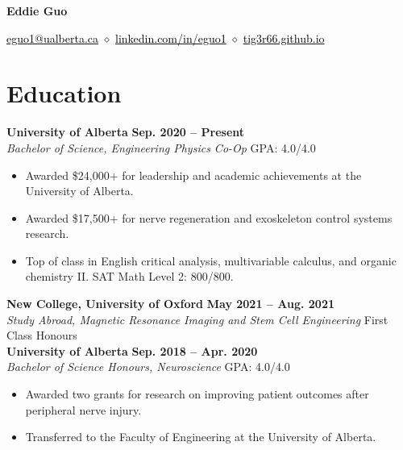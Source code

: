 \documentclass{article}
\begin{document}
\thispagestyle{plain}
\begin{center}
\LARGE \textbf{\textcolor{my_colour}{Eddie Guo}} \vspace{.2em}

\normalfont \normalsize
\href{mailto:eguo1@ualberta.ca}{\textcolor{black}{eguo1@ualberta.ca}}
    \hspace{.15em} $\diamond$ \hspace{.15em}
\href{https://www.linkedin.com/in/eguo1}{\textcolor{black}{linkedin.com/in/eguo1}}
    \hspace{.15em} $\diamond$ \hspace{.15em}
\href{https://tig3r66.github.io/index.html}{\textcolor{black}{tig3r66.github.io}}
\end{center}

\vspace{-1em}


\section*{\textcolor{my_colour}{Education}}
\vspace{-.25em} \hrulefill \vspace{.25em}

\textbf{University of Alberta} \hfill \textbf{Sep. 2020 -- Present} \\
\textit{Bachelor of Science, Engineering Physics Co-Op} \hfill GPA: 4.0/4.0
\begin{itemize}
    \item Awarded \$24,000+ for leadership and academic achievements at the University of Alberta.
    \item Awarded \$17,500+ for nerve regeneration and exoskeleton control systems research.
    \item Top of class in English critical analysis, multivariable calculus, and organic chemistry II. SAT Math Level 2: 800/800.
\end{itemize} \vspace{1em}

\textbf{New College, University of Oxford} \hfill \textbf{May 2021 -- Aug. 2021} \\
\textit{Study Abroad, Magnetic Resonance Imaging and Stem Cell Engineering} \hfill First Class Honours \\

\textbf{University of Alberta} \hfill \textbf{Sep. 2018 -- Apr. 2020} \\
\textit{Bachelor of Science Honours, Neuroscience} \hfill GPA: 4.0/4.0
\begin{itemize}
    \item Awarded two grants for research on improving patient outcomes after peripheral nerve injury.
    \item Transferred to the Faculty of Engineering at the University of Alberta.
\end{itemize}
\end{document}
